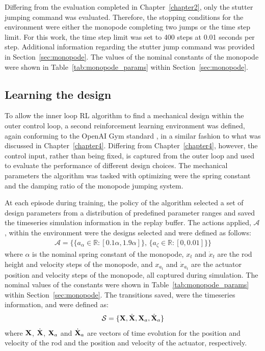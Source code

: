 Differing from the evaluation completed in Chapter~\ref{chapter2}, only the stutter jumping command was evaluated. Therefore, the stopping conditions for the environment were either the monopode completing two jumps or the time step limit. For this work, the time step limit was set to 400 steps at 0.01 seconds per step. Additional information regarding the stutter jump command was provided in Section~\ref{sec:monopode}. The values of the nominal constants of the monopode were shown in Table~\ref{tab:monopode_params} within Section~\ref{sec:monopode}.

\subsection{Learning the design}
To allow the inner loop RL algorithm to find a mechanical design within the outer control loop, a second reinforcement learning environment was defined, again conforming to the OpenAI Gym standard \cite{Brockman2016c}, in a similar fashion to what was discussed in Chapter~\ref{chapter4}. Differing from Chapter~\ref{chapter4}, however, the control input, rather than being fixed, is captured from the outer loop and used to evaluate the performance of different design choices. The mechanical parameters the algorithm was tasked with optimizing were the spring constant and the damping ratio of the monopode jumping system.

At each episode during training, the policy of the algorithm selected a set of design parameters from a distribution of predefined parameter ranges and saved the timeseries simulation information in the replay buffer. The actions applied, $\mathcal{A}$, within the environment were the designs selected and were defined as follows:
% 
\begin{equation}
    \begin{aligned}
    \mathcal{A} = \{ \{ a_{\alpha} \in \mathbb{R}: [0.1 \alpha, 1.9 \alpha] \}, \, \{ a_{\zeta} \in \mathbb{R}: [0, 0.01] \} \}
    \end{aligned}
\end{equation}
% 
where $\alpha$ is the nominal spring constant of the monopode, $x_t$ and $\dot{x}_t$ are the rod height and velocity steps of the monopode, and $x_{a_t}$ and $\dot{x}_{a_t}$ are the actuator position and velocity steps of the monopode, all captured during simulation. The nominal values of the constants were shown in Table~\ref{tab:monopode_params} within Section~\ref{sec:monopode}. The transitions saved, were the timeseries information, and were defined as:
% 
\begin{equation}
  \begin{aligned}
    \mathcal{S}= \{ \textup{\textbf{X}}, \dot{\textup{\textbf{X}}}, \textup{\textbf{X}}_a, \dot{\textup{\textbf{X}}}_a \}
  \end{aligned}
\end{equation}
% 
where $\textup{\textbf{X}}$, $\dot{\textup{\textbf{X}}}$, $\textup{\textbf{X}}_a$ and $\dot{\textup{\textbf{X}}}_a$ are vectors of time evolution for the position and velocity of the rod and the position and velocity of the actuator, respectively.

